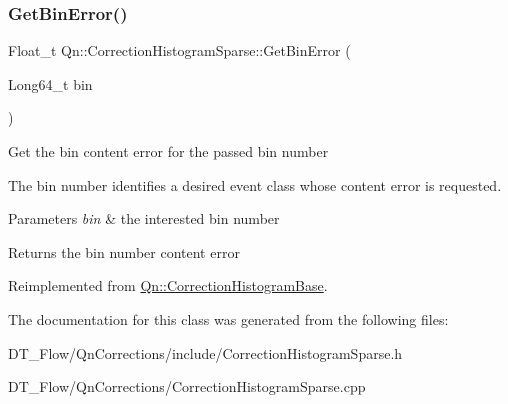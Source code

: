 \mbox{\label{classQn_1_1CorrectionHistogramSparse_a9b678b088ca0b21e6deb18d66ac44c2d}} 
\subsubsection{\texorpdfstring{Get\+Bin\+Error()}{GetBinError()}}
{\footnotesize\ttfamily Float\+\_\+t Qn\+::\+Correction\+Histogram\+Sparse\+::\+Get\+Bin\+Error (\begin{DoxyParamCaption}\item[{Long64\+\_\+t}]{bin }\end{DoxyParamCaption})\hspace{0.3cm}{\ttfamily [virtual]}}

Get the bin content error for the passed bin number

The bin number identifies a desired event class whose content error is requested.


\begin{DoxyParams}{Parameters}
{\em bin} & the interested bin number \\
\hline
\end{DoxyParams}
\begin{DoxyReturn}{Returns}
the bin number content error 
\end{DoxyReturn}


Reimplemented from \mbox{\hyperlink{classQn_1_1CorrectionHistogramBase_a50a7dd4c5bbe5e4d0e405365c2a9104d}{Qn\+::\+Correction\+Histogram\+Base}}.



The documentation for this class was generated from the following files\+:\begin{DoxyCompactItemize}
\item 
D\+T\+\_\+\+Flow/\+Qn\+Corrections/include/Correction\+Histogram\+Sparse.\+h\item 
D\+T\+\_\+\+Flow/\+Qn\+Corrections/Correction\+Histogram\+Sparse.\+cpp\end{DoxyCompactItemize}
